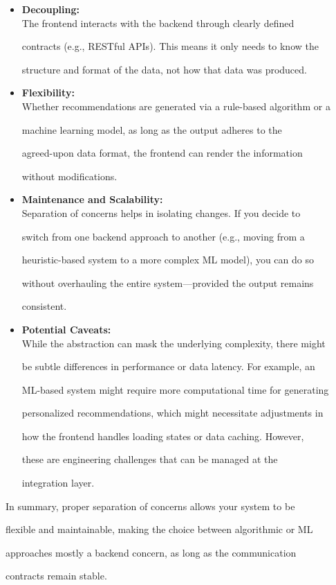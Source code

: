 \documentclass[11pt]{article}
\begin{document}
\begin{itemize}

\item

  \textbf{Decoupling:}\\

  The frontend interacts with the backend through clearly defined

  contracts (e.g., RESTful APIs). This means it only needs to know the

  structure and format of the data, not how that data was produced.

\item

  \textbf{Flexibility:}\\

  Whether recommendations are generated via a rule-based algorithm or a

  machine learning model, as long as the output adheres to the

  agreed-upon data format, the frontend can render the information

  without modifications.

\item

  \textbf{Maintenance and Scalability:}\\

  Separation of concerns helps in isolating changes. If you decide to

  switch from one backend approach to another (e.g., moving from a

  heuristic-based system to a more complex ML model), you can do so

  without overhauling the entire system---provided the output remains

  consistent.

\item

  \textbf{Potential Caveats:}\\

  While the abstraction can mask the underlying complexity, there might

  be subtle differences in performance or data latency. For example, an

  ML-based system might require more computational time for generating

  personalized recommendations, which might necessitate adjustments in

  how the frontend handles loading states or data caching. However,

  these are engineering challenges that can be managed at the

  integration layer.

\end{itemize}



In summary, proper separation of concerns allows your system to be

flexible and maintainable, making the choice between algorithmic or ML

approaches mostly a backend concern, as long as the communication

contracts remain stable.
\end{document}
